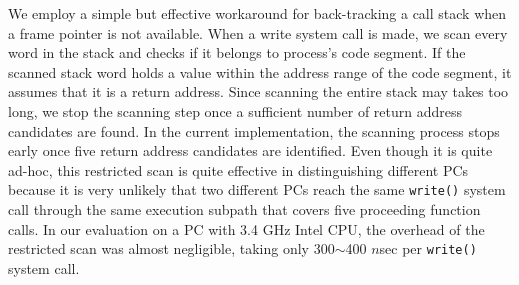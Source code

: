 We employ a simple but effective workaround for back-tracking a call stack when
a frame pointer is not available.  When a write system call is made,
we scan every word in the stack
and checks if it belongs to process's code segment.  If the scanned stack word
holds a value within the address range of the code segment, it assumes that it
is a return address.  Since scanning the entire stack may takes too long, we stop
the scanning step once a sufficient number of return address candidates are found.
In the current implementation, the scanning process stops early once 
five return address candidates are identified.  
Even though it is quite ad-hoc, this restricted scan is quite effective
in distinguishing different PCs because it is very unlikely that two different PCs
reach the same \texttt{write()} system call through the same execution subpath 
that covers five proceeding function calls. 
In our evaluation on a PC with 3.4 GHz Intel CPU, the overhead of the
restricted scan was almost negligible, taking only 300$\sim$400 $n$sec per
\texttt{write()} system call.

